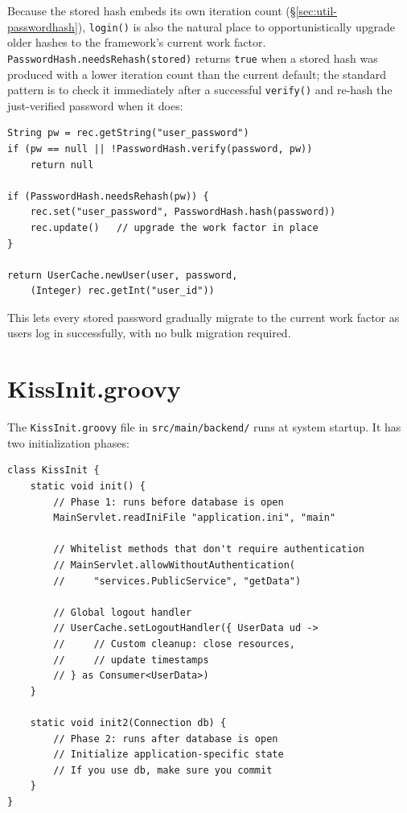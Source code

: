 \noindent
Because the stored hash embeds its own iteration count (\S\ref{sec:util-passwordhash}), \texttt{login()} is also the natural place to opportunistically upgrade older hashes to the framework's current work factor.  \texttt{PasswordHash.needsRehash(stored)} returns \texttt{true} when a stored hash was produced with a lower iteration count than the current default; the standard pattern is to check it immediately after a successful \texttt{verify()} and re-hash the just-verified password when it does:

\begin{lstlisting}[style=groovy]
String pw = rec.getString("user_password")
if (pw == null || !PasswordHash.verify(password, pw))
    return null

if (PasswordHash.needsRehash(pw)) {
    rec.set("user_password", PasswordHash.hash(password))
    rec.update()   // upgrade the work factor in place
}

return UserCache.newUser(user, password,
    (Integer) rec.getInt("user_id"))
\end{lstlisting}

\noindent
This lets every stored password gradually migrate to the current work factor as users log in successfully, with no bulk migration required.

\section{KissInit.groovy}
\label{sec:auth-init}

The \texttt{KissInit.groovy} file in \texttt{src/main/backend/} runs at system startup.  It has two initialization phases:

\begin{lstlisting}[style=groovy]
class KissInit {
    static void init() {
        // Phase 1: runs before database is open
        MainServlet.readIniFile "application.ini", "main"

        // Whitelist methods that don't require authentication
        // MainServlet.allowWithoutAuthentication(
        //     "services.PublicService", "getData")

        // Global logout handler
        // UserCache.setLogoutHandler({ UserData ud ->
        //     // Custom cleanup: close resources,
        //     // update timestamps
        // } as Consumer<UserData>)
    }

    static void init2(Connection db) {
        // Phase 2: runs after database is open
        // Initialize application-specific state
        // If you use db, make sure you commit
    }
}
\end{lstlisting}

